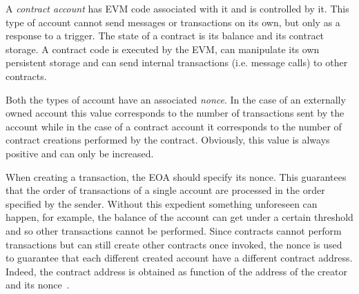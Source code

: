 A \emph{contract account} has EVM code associated with it and is controlled by
it. This type of account cannot send messages or transactions on its own, but
only as a response to a trigger. The state of a contract is its balance and its
contract storage. A contract code is executed by the EVM, can manipulate its own
persistent storage and can send internal transactions (i.e. message calls) to
other contracts.

Both the types of account have an associated \emph{nonce}. In the case of an
externally owned account this value corresponds to the number of transactions
sent by the account while in the case of a contract account it corresponds to
the number of contract creations performed by the contract. Obviously, this 
value is always positive and can only be increased.

When creating a transaction, the EOA should specify its nonce. This guarantees
that the order of transactions of a single account are processed in the order
specified by the sender. Without this expedient something unforeseen can happen,
for example, the balance of the account can get under a certain threshold and so
other transactions cannot be performed. Since contracts cannot perform
transactions but can still create other contracts once invoked, the nonce is
used to guarantee that each different created account have a different contract
address. Indeed, the contract address is obtained as function of the address of
the creator and its nonce~\cite{wood2018ethereum}.
